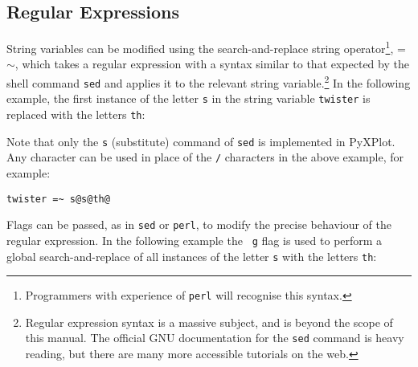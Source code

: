 \vspace{3mm}
\newline
{}\newline
{}\newline
{}
\vspace{3mm}

\subsection{Regular Expressions}

String variables can be modified using the search-and-replace string
operator\footnote{Programmers with
experience of {\tt perl} will recognise this syntax.}, =$\sim$, which takes a regular expression with a syntax similar to that
expected by the shell command {\tt sed} and applies it to the relevant string variable.\footnote{Regular
expression syntax is a massive subject, and is beyond the scope of this manual.
The official GNU documentation for the {\tt sed} command is heavy reading, but
there are many more accessible tutorials on the web.} In the following example, the first instance of the letter {\tt s} in
the string variable {\tt twister} is replaced with the letters {\tt th}:

\vspace{3mm}
\newline
{}\newline
{}\newline
{}
\vspace{3mm}

Note that only the {\tt s} (substitute) command of {\tt sed} is implemented in
PyXPlot. Any character can be used in place of the {\tt /} characters in the
above example, for example:

\begin{verbatim}
twister =~ s@s@th@
\end{verbatim}

\noindent Flags can be passed, as in {\tt sed} or {\tt perl}, to modify the
precise behaviour of the regular expression. In the following example the {\tt
g} flag is used to perform a global search-and-replace of all instances of the
letter {\tt s} with the letters {\tt th}:

